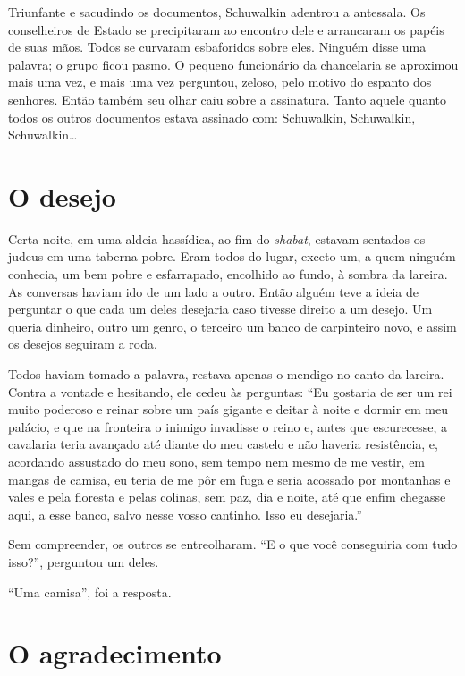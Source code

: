 Triunfante e sacudindo os documentos, Schuwalkin adentrou a antessala.
Os conselheiros de Estado se precipitaram ao encontro dele e arrancaram
os papéis de suas mãos. Todos se curvaram esbaforidos sobre eles.
Ninguém disse uma palavra; o grupo ficou pasmo. O pequeno funcionário da
chancelaria se aproximou mais uma vez, e mais uma vez perguntou, zeloso,
pelo motivo do espanto dos senhores. Então também seu olhar caiu sobre a
assinatura. Tanto aquele quanto todos os outros documentos estava
assinado com: Schuwalkin, Schuwalkin, Schuwalkin\ldots{}

\section{O desejo }

Certa noite, em uma aldeia hassídica, ao fim do \emph{shabat}, estavam
sentados os judeus em uma taberna pobre. Eram todos do lugar, exceto um,
a quem ninguém conhecia, um bem pobre e esfarrapado, encolhido ao fundo,
à sombra da lareira. As conversas haviam ido de um lado a outro. Então
alguém teve a ideia de perguntar o que cada um deles desejaria caso
tivesse direito a um desejo. Um queria dinheiro, outro um genro, o
terceiro um banco de carpinteiro novo, e assim os desejos seguiram a
roda.

Todos haviam tomado a palavra, restava apenas o mendigo no canto da
lareira. Contra a vontade e hesitando, ele cedeu às perguntas: ``Eu
gostaria de ser um rei muito poderoso e reinar sobre um país gigante e
deitar à noite e dormir em meu palácio, e que na fronteira o inimigo
invadisse o reino e, antes que escurecesse, a cavalaria teria avançado
até diante do meu castelo e não haveria resistência, e, acordando
assustado do meu sono, sem tempo nem mesmo de me vestir, em mangas de
camisa, eu teria de me pôr em fuga e seria acossado por montanhas e
vales e pela floresta e pelas colinas, sem paz, dia e noite, até que
enfim chegasse aqui, a esse banco, salvo nesse vosso cantinho. Isso eu
desejaria.''

Sem compreender, os outros se entreolharam. ``E o que você conseguiria
com tudo isso?'', perguntou um deles.

``Uma camisa'', foi a resposta.

\section{O agradecimento}

